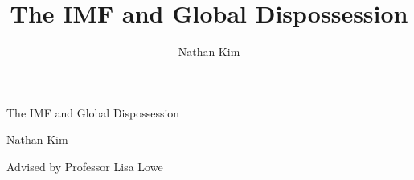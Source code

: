\title{\Huge The IMF and Global Dispossession}
\author{Nathan Kim}


\begin{titlepage}
  \vspace*{\fill}
  \begin{center}
    
    \begin{Huge}
      The IMF and Global Dispossession
    \end{Huge}

    \begin{large}
      Nathan Kim

      Advised by Professor Lisa Lowe
    \end{large}
  \end{center}

  \vspace{5cm}
  \vspace*{\fill}
\end{titlepage}

\tableofcontents
{}
\clearpage

\setcounter{page}{1}
